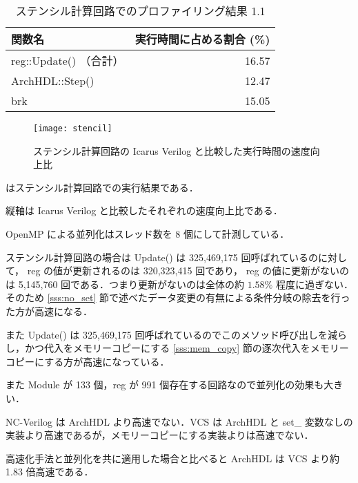
\begin{table}[t]
 \caption{ステンシル計算回路でのプロファイリング結果 1.1}
 \label{table:stencil_prof1.1}
 \begin{center}
  \begin{tabular}{lr} \toprule
  関数名 & 実行時間に占める割合 (\%) \\ \midrule
  reg::Update() （合計） & 16.57 \\
  ArchHDL::Step() & 12.47 \\
  brk & 15.05 \\ \bottomrule
  \end{tabular}
 \end{center}
\end{table}

\fi

\begin{figure}[t]
 \centering
 \texttt{[image: stencil]}
 \caption{ステンシル計算回路の Icarus Verilog と比較した実行時間の速度向上比}
 \label{fig:stencil}
\end{figure}

 はステンシル計算回路での実行結果である．

縦軸は Icarus Verilog と比較したそれぞれの速度向上比である．

OpenMP による並列化はスレッド数を 8 個にして計測している．

ステンシル計算回路の場合は Update() は 325,469,175
回呼ばれているのに対して， reg の値が更新されるのは 320,323,415
回であり， reg の値に更新がないのは 5,145,760
回である．つまり更新がないのは全体の約 $1.58\%$ 程度に過ぎない．そのため
\ref{sss:no_set}
節で述べたデータ変更の有無による条件分岐の除去を行った方が高速になる．

また Update() は 325,469,175
回呼ばれているのでこのメソッド呼び出しを減らし，かつ代入をメモリーコピーにする
\ref{sss:mem_copy}
節の逐次代入をメモリーコピーにする方が高速になっている．

また Module が 133 個，reg が 991
個存在する回路なので並列化の効果も大きい．

NC-Verilog は ArchHDL より高速でない．VCS は ArchHDL と set\_
変数なしの実装より高速であるが，メモリーコピーにする実装よりは高速でない．

高速化手法と並列化を共に適用した場合と比べると ArchHDL は VCS より約 1.83 倍高速である．




